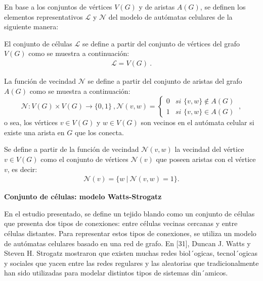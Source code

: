 \documentclass[a4paper,11pt]{article}
\begin{document}
{En base a los conjuntos de vértices $V(G)$ y de aristas $A(G)$, se definen los elementos representativos $\mathcal{L}$ y $\mathcal{N}$ del modelo de autómatas celulares de la siguiente manera:

El conjunto de c\'elulas $\mathcal{L}$ se define a partir del conjunto de v\'ertices del grafo $V(G)$ como se muestra a continuaci\'on: 
\begin{align}
\boxed{\mathcal{L} = V(G)}~. \label{eq-L}
\end{align}

La funci\'on de vecindad $\mathcal{N}$ se define a partir del conjunto de aristas del grafo $A(G)$ como se muestra a continuaci\'on:
\begin{subequations}
\begin{equation}
\boxed{\mathcal{N} : V(G) \times V(G) \rightarrow \lbrace 0,1 \rbrace}~, \label{eq-N}
\end{equation}
\begin{equation}
\boxed{\mathcal{N}(v,w) = \left\lbrace
	\begin{array}{lr}
		0& \textit{si } \lbrace v,w \rbrace \notin A(G)\\
		1& \textit{si } \lbrace v,w \rbrace \in A(G)
	\end{array}
\right.}~, \label{eq-N-2}
\end{equation}
\end{subequations}
o sea, los v\'ertices $v \in V(G)$ y $w \in V(G)$ son vecinos en el aut\'omata celular si existe una arista en $G$ que los conecta.

Se define a partir de la funci\'on de vecindad $\mathcal{N}(v,w)$ la vecindad del v\'ertice $v \in V(G)$ como el conjunto de v\'ertices $\mathcal{N}(v)$ que poseen aristas con el v\'ertice $v$, es decir:
\begin{align} 
\mathcal{N}(v) = \lbrace w~|~\mathcal{N}(v,w)=1 \rbrace. \label{eq-neighbourhood}
\end{align}

\textbf{Conjunto de c\'elulas: modelo Watts-Strogatz}

En el estudio presentado, se define un tejido blando como un conjunto de células que presenta dos tipos de conexiones: entre células vecinas cercanas y entre células distantes. Para representar estos tipos de conexiones, se utiliza un modelo de autómatas celulares basado en una red de grafo. En [31],
Duncan J. Watts y Steven H. Strogatz mostraron que existen muchas redes biol´ogicas, tecnol´ogicas y sociales que yacen entre las redes regulares y las aleatorias que tradicionalmente han sido
utilizadas para modelar distintos tipos de sistemas din´amicos. 

}
\end{document}
